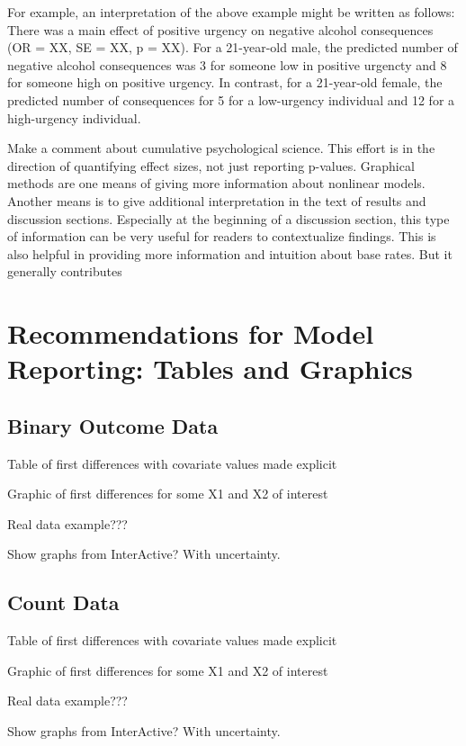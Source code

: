 \documentclass[jou, apacite]{apa6}
\begin{document}
For example, an interpretation of the above example might be written as follows: There was a main effect of positive urgency on negative alcohol consequences (OR = XX, SE = XX, p = XX). For a 21-year-old male, the predicted number of negative alcohol consequences was 3 for someone low in positive urgencty and 8 for someone high on positive urgency. In contrast, for a 21-year-old female, the predicted number of consequences for 5 for a low-urgency individual and 12 for a high-urgency individual.

Make a comment about cumulative psychological science. This effort is in the direction of quantifying effect sizes, not just reporting p-values. Graphical methods are one means of giving more information about nonlinear models. Another means is to give additional interpretation in the text of results and discussion sections. Especially at the beginning of a discussion section, this type of information can be very useful for readers to contextualize findings. This is also helpful in providing more information and intuition about base rates. But it generally contributes 

\section{Recommendations for Model Reporting: Tables and Graphics}
\subsection{Binary Outcome Data}
Table of first differences with covariate values made explicit

Graphic of first differences for some X1 and X2 of interest	

Real data example???

Show graphs from InterActive? With uncertainty.

\subsection{Count Data}
Table of first differences with covariate values made explicit

Graphic of first differences for some X1 and X2 of interest

Real data example???

Show graphs from InterActive? With uncertainty.
\end{document}
